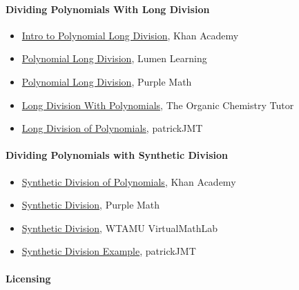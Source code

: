 \paragraph{Dividing Polynomials With Long Division}

\begin{itemize}
    \item \href{https://www.khanacademy.org/math/algebra2/x2ec2f6f830c9fb89:poly-div/x2ec2f6f830c9fb89:quad-div-by-linear/v/polynomial-division}{Intro to Polynomial Long Division}, Khan Academy
    \item \href{https://courses.lumenlearning.com/waymakercollegealgebra/chapter/polynomial-long-division/}{Polynomial Long Division}, Lumen Learning
    \item \href{https://www.purplemath.com/modules/polydiv2.htm}{Polynomial Long Division}, Purple Math
    \item \href{https://www.youtube.com/watch?v=_FSXJmESFmQ}{Long Division With Polynomials}, The Organic Chemistry Tutor
    \item \href{https://www.youtube.com/watch?v=l6_ghhd7kwQ}{Long Division of Polynomials}, patrickJMT
\end{itemize}

\paragraph{Dividing Polynomials with Synthetic Division}

\begin{itemize}
    \item \href{https://www.khanacademy.org/math/algebra-home/alg-polynomials/alg-synthetic-division-of-polynomials/v/synthetic-division}{Synthetic Division of Polynomials}, Khan Academy
    \item \href{https://www.purplemath.com/modules/synthdiv.htm}{Synthetic Division}, Purple Math
    \item \href{https://www.wtamu.edu/academic/anns/mps/math/mathlab/col_algebra/col_alg_tut37_syndiv.htm}{Synthetic Division}, WTAMU VirtualMathLab
    \item \href{https://www.youtube.com/watch?v=bZoMz1Cy1T4}{Synthetic Division Example}, patrickJMT
\end{itemize}

\paragraph{Licensing}


